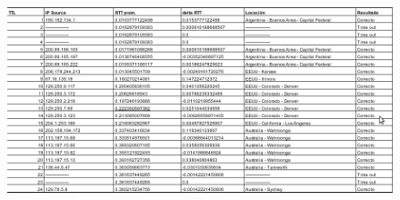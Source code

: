 \begin{figure}[h]
	\begin{center}
    \includegraphics[width=1\textwidth]{img_analisis2/tabla.png} 
	\end{center} 
\end{figure}
